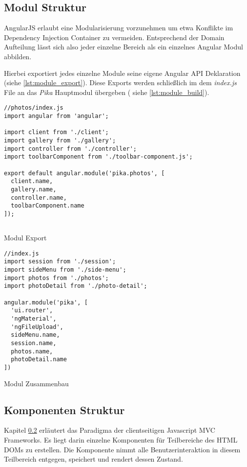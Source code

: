 \subsection{Modul Struktur}

AngularJS erlaubt eine Modularisierung vorzunehmen um etwa Konflikte im Dependency Injection Container zu vermeiden. Entsprechend der Domain Aufteilung lässt sich also jeder einzelne Bereich als ein einzelnes Angular Modul abbilden.

Hierbei exportiert jedes einzelne Module seine eigene Angular API Deklaration (siehe \ref{lst:module_export}). Diese Exports werden schließlich im dem \textit{index.js} File an das \textit{Pika} Hauptmodul übergeben ( siehe \ref{lst:module_build}).


\begin{listing}[H]
\begin{verbatim}
//photos/index.js
import angular from 'angular';

import client from './client';
import gallery from './gallery';
import controller from './controller';
import toolbarComponent from './toolbar-component.js';

export default angular.module('pika.photos', [
  client.name,
  gallery.name,
  controller.name,
  toolbarComponent.name
]);
 
\end{verbatim}
\caption{Modul Export}
\label{lst:module_export}
\end{listing}

\begin{listing}[H]
\begin{verbatim}
//index.js
import session from './session';
import sideMenu from './side-menu';
import photos from './photos';
import photoDetail from './photo-detail';

angular.module('pika', [
  'ui.router',
  'ngMaterial',
  'ngFileUpload',
  sideMenu.name,
  session.name,
  photos.name,
  photoDetail.name
])
\end{verbatim}
\caption{Modul Zusammenbau}
\label{lst:module_build}
\end{listing}

\subsection{Komponenten Struktur}

Kapitel \ref{} erläutert das Paradigma der clientseitigen Javascript MVC Frameworks. Es liegt darin einzelne Komponenten für Teilbereiche des HTML DOMs zu erstellen. Die Komponente nimmt alle Benutzerinteraktion in diesem Teilbereich entgegen, speichert und rendert dessen Zustand. 

